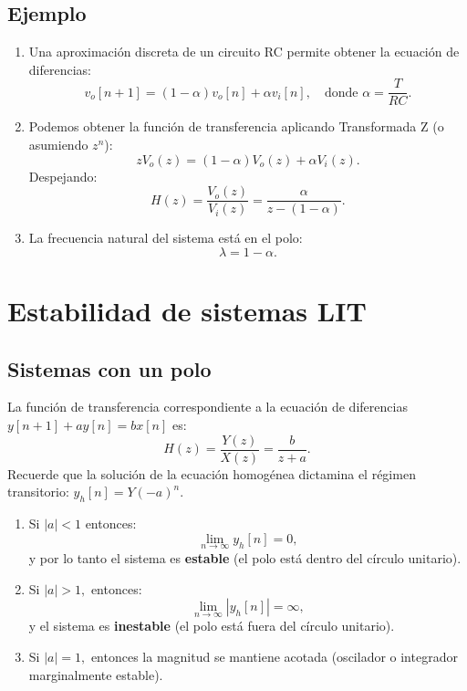 \documentclass[11pt,a4paper,openany]{book}
\begin{document}
\subsection{Ejemplo}
\begin{enumerate}
	\item Una aproximaci\'{o}n discreta de un circuito RC permite obtener la ecuaci\'{o}n de diferencias:
	\begin{equation}
		v_o[n+1] = (1-\alpha) v_o[n] + \alpha v_i[n], \quad \text{donde } \alpha = \frac{T}{RC}.
	\end{equation}
	
	\item Podemos obtener la funci\'{o}n de transferencia aplicando Transformada Z (o asumiendo $z^n$):
	\begin{equation}
		z V_o(z) = (1-\alpha) V_o(z) + \alpha V_i(z).
	\end{equation}
	Despejando:
	\begin{equation}
		H(z) = \frac{V_o(z)}{V_i(z)} = \frac{\alpha}{z - (1-\alpha)}.
	\end{equation}
	
	\item La frecuencia natural del sistema está en el polo:
	\begin{equation}
		\lambda = 1-\alpha.
	\end{equation}
\end{enumerate}

\section{Estabilidad de sistemas LIT}

\subsection{Sistemas con un polo}

La funci\'{o}n de transferencia correspondiente a la ecuaci\'{o}n de diferencias $y[n+1] + ay[n] = bx[n]$ es:
\begin{equation}
	H(z) = \frac{Y(z)}{X(z)} = \frac{b}{z+a}.
\end{equation}
Recuerde que la soluci\'{o}n de la ecuaci\'{o}n homog\'{e}nea dictamina el régimen transitorio: $y_h[n] = Y(-a)^n$.

\begin{enumerate}
	\item Si $|a| < 1$ entonces:
	\begin{equation}
		\lim_{n \to \infty} y_h[n] = 0,
	\end{equation}
	y por lo tanto el sistema es \textbf{estable} (el polo está dentro del círculo unitario).
	
	\item Si $|a| > 1,$ entonces:
	\begin{equation}
		\lim_{n \to \infty} |y_h[n]| = \infty,
	\end{equation}
	y el sistema es \textbf{inestable} (el polo está fuera del círculo unitario).
	
	\item Si $|a| = 1,$ entonces la magnitud se mantiene acotada (oscilador o integrador marginalmente estable).
\end{enumerate}
\end{document}
